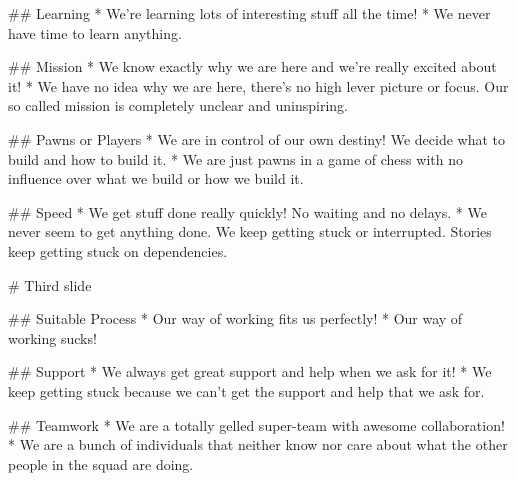 ## Learning
* We're learning lots of interesting stuff all the time!
* We never have time to learn anything.

## Mission
* We know exactly why we are here and we’re really excited about it!
* We have no idea why we are here, there's no high lever picture or focus. Our so called mission is completely unclear and uninspiring.

## Pawns or Players
* We are in control of our own destiny! We decide what to build and how to build it.
* We are just pawns in a game of chess with no influence over what we build or how we build it.

## Speed
* We get stuff done really quickly! No waiting and no delays.
* We never seem to get anything done. We keep getting stuck or interrupted. Stories keep getting stuck on dependencies.

# Third slide

## Suitable Process
* Our way of working fits us perfectly!
* Our way of working sucks!

## Support
* We always get great support and help when we ask for it!
* We keep getting stuck because we can't get the support and help that we ask for.

## Teamwork
* We are a totally gelled super-team with awesome collaboration!
* We are a bunch of individuals that neither know nor care about what the other people in the squad are doing.

